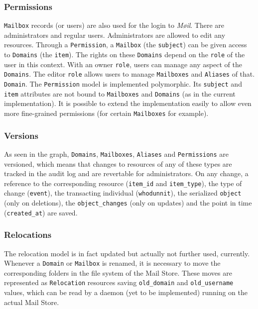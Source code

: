 \documentclass[12pt,a4paper]{scrartcl}
\begin{document}
			\subsubsection*{Permissions}
				\texttt{Mailbox} records (or users) are also used for the login
				to \emph{Møil}. There are administrators and regular users.
				Administrators are allowed to edit any resources. Through a
				\texttt{Permission}, a \texttt{Mailbox} (the \texttt{subject})
				can be given access to \texttt{Domains} (the \texttt{item}).
				The rights on these \texttt{Domains} depend on the
				\texttt{role} of the user in this context. With an owner
				\texttt{role}, users can manage any aspect of the
				\texttt{Domains}. The editor \texttt{role} allows users to
				manage \texttt{Mailboxes} and \texttt{Aliases} of that.
				\texttt{Domain}. The \texttt{Permission} model is implemented
				polymorphic. Its \texttt{subject} and \texttt{item} attributes
				are not bound to \texttt{Mailboxes} and \texttt{Domains} (as in
				the current implementation). It is possible to extend the
				implementation easily to allow even more fine-grained
				permissions (for certain \texttt{Mailboxes} for example).

			\subsubsection*{Versions}
				As seen in the graph, \texttt{Domains}, \texttt{Mailboxes},
				\texttt{Aliases} and \texttt{Permissions} are versioned, which
				means that changes to resources of any of these types are
				tracked in the audit log and are revertable for administrators.
				On any change, a reference to the corresponding resource
				(\texttt{item\_id} and \texttt{item\_type}), the type of change
				(\texttt{event}), the transacting individual
				(\texttt{whodunnit}), the serialized \texttt{object} (only on
				deletions), the \texttt{object\_changes} (only on updates) and
				the point in time (\texttt{created\_at}) are saved.

			\subsubsection*{Relocations}
			\label{sec:moeil:model:relocation}
				The relocation model is in fact updated but actually not
				further used, currently. Whenever a \texttt{Domain} or
				\texttt{Mailbox} is renamed, it is necessary to move the
				corresponding folders in the file system of the Mail Store.
				These moves are represented as \texttt{Relocation} resources
				saving \texttt{old\_domain} and \texttt{old\_username} values,
				which can be read by a daemon (yet to be implemented) running
				on the actual Mail Store.
\end{document}
